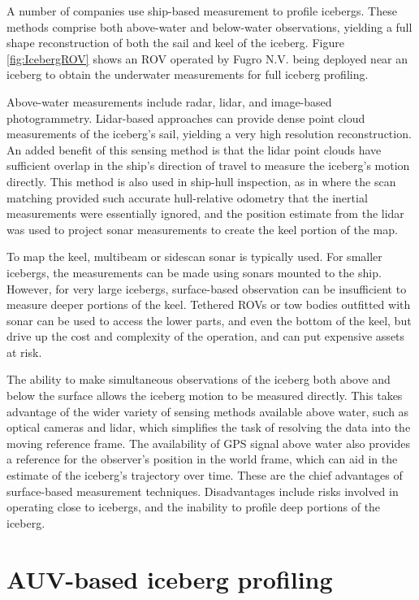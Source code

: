 A number of companies use ship-based measurement to profile icebergs. These methods comprise both above-water and below-water observations, yielding a full shape reconstruction of both the sail and keel of the iceberg. Figure \ref{fig:IcebergROV} shows an ROV operated by Fugro N.V. being deployed near an iceberg to obtain the underwater measurements for full iceberg profiling.

Above-water measurements include radar, lidar, and image-based photogrammetry. Lidar-based approaches can provide dense point cloud measurements of the iceberg's sail, yielding a very high resolution reconstruction. An added benefit of this sensing method is that the lidar point clouds have sufficient overlap in the ship's direction of travel to measure the iceberg's motion directly. This method is also used in ship-hull inspection, as in \cite{Papadopoulos2014} where the scan matching provided such accurate hull-relative odometry that the inertial measurements were essentially ignored, and the position estimate from the lidar was used to project sonar measurements to create the keel portion of the map.

To map the keel, multibeam or sidescan sonar is typically used. For smaller icebergs, the measurements can be made using sonars mounted to the ship. However, for very large icebergs, surface-based observation can be insufficient to measure deeper portions of the keel. Tethered ROVs or tow bodies outfitted with sonar can be used to access the lower parts, and even the bottom of the keel, but drive up the cost and complexity of the operation, and can put expensive assets at risk. 

The ability to make simultaneous observations of the iceberg both above and below the surface allows the iceberg motion to be measured directly. This takes advantage of the wider variety of sensing methods available above water, such as optical cameras and lidar, which simplifies the task of resolving the data into the moving reference frame. The availability of GPS signal above water also provides a reference for the observer's position in the world frame, which can aid in the estimate of the iceberg's trajectory over time. These are the chief advantages of surface-based measurement techniques. Disadvantages include risks involved in operating close to icebergs, and the inability to profile deep portions of the iceberg. 

\section{AUV-based iceberg profiling}

